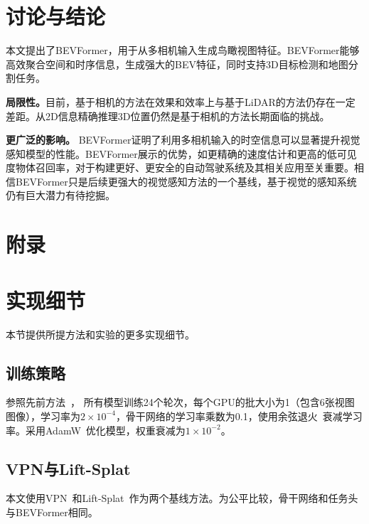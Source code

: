 \documentclass{article}
\begin{document}
\section{讨论与结论}

本文提出了BEVFormer，用于从多相机输入生成鸟瞰视图特征。BEVFormer能够高效聚合空间和时序信息，生成强大的BEV特征，同时支持3D目标检测和地图分割任务。

\noindent\textbf{局限性。}目前，基于相机的方法在效果和效率上与基于LiDAR的方法仍存在一定差距。从2D信息精确推理3D位置仍然是基于相机的方法长期面临的挑战。

\noindent\textbf{更广泛的影响。}
BEVFormer证明了利用多相机输入的时空信息可以显著提升视觉感知模型的性能。BEVFormer展示的优势，如更精确的速度估计和更高的低可见度物体召回率，对于构建更好、更安全的自动驾驶系统及其相关应用至关重要。相信BEVFormer只是后续更强大的视觉感知方法的一个基线，基于视觉的感知系统仍有巨大潜力有待挖掘。 





\clearpage

\section*{附录}
\appendix


\section{实现细节}
本节提供所提方法和实验的更多实现细节。

\subsection{训练策略}





参照先前方法~\cite{wang2022detr3d,zhu2020deformable}，
所有模型训练24个轮次，每个GPU的批大小为1（包含6张视图图像），学习率为$2\!\times\!10^{-4}$，骨干网络的学习率乘数为0.1，使用余弦退火~\cite{Loshchilov2017SGDRSG}衰减学习率。采用AdamW~\cite{Loshchilov2019DecoupledWD}优化模型，权重衰减为$1\!\times\!10^{-2}$。

\subsection{VPN与Lift-Splat}
本文使用VPN~\cite{pan2020cross}和Lift-Splat~\cite{philion2020lift}作为两个基线方法。为公平比较，骨干网络和任务头与BEVFormer相同。
\end{document}
